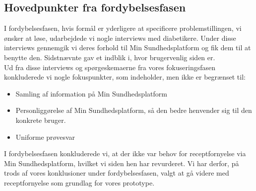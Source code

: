 \subsection{Hovedpunkter fra fordybelsesfasen}
I fordybelsesfasen, hvis formål er yderligere at specificere problemstillingen, vi ønsker at løse, udarbejdede vi nogle interviews med diabetikere. Under disse interviews gennemgik vi deres forhold til Min Sundhedsplatform og fik dem til at benytte den. Sidstnævnte gav et indblik i, hvor brugervenlig siden er.\\
Ud fra disse interviews og spørgeskemaerne fra vores fokuseringsfasen konkluderede vi nogle fokuspunkter, som indeholder, men ikke er begrænset til:
\begin{itemize}
  \item Samling af information på Min Sundhedsplatform
  \item Personliggørelse af Min Sundhedsplatform, så den bedre henvender sig til den konkrete bruger.
  \item Uniforme prøvesvar
\end{itemize}
I fordybelsesfasen konkluderede vi, at der ikke var behov for receptfornyelse via Min Sundhedsplatform, hvilket vi siden hen har revurderet. Vi har derfor, på trods af vores konklusioner under fordybelsesfasen, valgt at gå videre med receptfornyelse som grundlag for vores prototype. 

